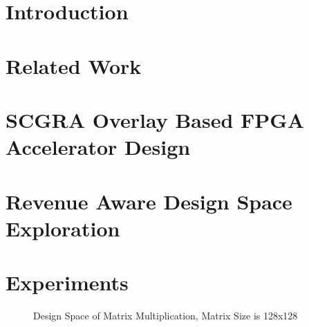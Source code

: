 \documentclass{acm_proc_article-sp}
\begin{document}
%
%
%
%
%
%

\section{Introduction}

\section{Related Work}

\section{SCGRA Overlay Based FPGA Accelerator Design}

\section{Revenue Aware Design Space Exploration}

\section{Experiments}

  \begin{figure}
    \hfill
    \hfill
    \caption{Design Space of Matrix Multiplication, Matrix Size is 128x128}
    \label{fig:mm-DSE}
  \end{figure}
\end{document}
